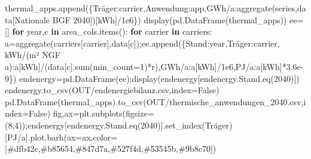 \documentclass[
  ngerman,
  a4paper,
  DIV=11]{scrreprt}
\newenvironment{Shaded}{\begin{snugshade}}{\end{snugshade}}
\newcommand{\BuiltInTok}[1]{\textcolor[rgb]{0.00,0.23,0.31}{#1}}
\newcommand{\ControlFlowTok}[1]{\textcolor[rgb]{0.00,0.23,0.31}{\textbf{#1}}}
\newcommand{\DecValTok}[1]{\textcolor[rgb]{0.68,0.00,0.00}{#1}}
\newcommand{\FloatTok}[1]{\textcolor[rgb]{0.68,0.00,0.00}{#1}}
\newcommand{\KeywordTok}[1]{\textcolor[rgb]{0.00,0.23,0.31}{\textbf{#1}}}
\newcommand{\NormalTok}[1]{\textcolor[rgb]{0.00,0.23,0.31}{#1}}
\newcommand{\OperatorTok}[1]{\textcolor[rgb]{0.37,0.37,0.37}{#1}}
\newcommand{\StringTok}[1]{\textcolor[rgb]{0.13,0.47,0.30}{#1}}
\newcommand{\VariableTok}[1]{\textcolor[rgb]{0.07,0.07,0.07}{#1}}
\begin{document}
\begin{Shaded}
\begin{Highlighting}[]
\NormalTok{        thermal\_apps.append(\{}\StringTok{\textquotesingle{}Träger\textquotesingle{}}\NormalTok{:carrier,}\StringTok{\textquotesingle{}Anwendung\textquotesingle{}}\NormalTok{:app,}\StringTok{\textquotesingle{}GWh/a\textquotesingle{}}\NormalTok{:aggregate(series,data[}\StringTok{\textquotesingle{}Nationale BGF 2040\textquotesingle{}}\NormalTok{])[}\StringTok{\textquotesingle{}kWh\textquotesingle{}}\NormalTok{]}\OperatorTok{/}\FloatTok{1e6}\NormalTok{\})}
\NormalTok{display(pd.DataFrame(thermal\_apps))}
\NormalTok{ee}\OperatorTok{=}\NormalTok{[]}
\ControlFlowTok{for}\NormalTok{ year,c }\KeywordTok{in}\NormalTok{ area\_cols.items():}
    \ControlFlowTok{for}\NormalTok{ carrier }\KeywordTok{in}\NormalTok{ carriers:}
\NormalTok{        a}\OperatorTok{=}\NormalTok{aggregate(carriers[carrier],data[c])}\OperatorTok{;}\NormalTok{ee.append(\{}\StringTok{\textquotesingle{}Stand\textquotesingle{}}\NormalTok{:year,}\StringTok{\textquotesingle{}Träger\textquotesingle{}}\NormalTok{:carrier,}
            \StringTok{\textquotesingle{}kWh/(m² NGF a)\textquotesingle{}}\NormalTok{:a[}\StringTok{\textquotesingle{}kWh\textquotesingle{}}\NormalTok{]}\OperatorTok{/}\NormalTok{(data[c].}\BuiltInTok{sum}\NormalTok{(min\_count}\OperatorTok{=}\DecValTok{1}\NormalTok{)}\OperatorTok{*}\NormalTok{r),}\StringTok{\textquotesingle{}GWh/a\textquotesingle{}}\NormalTok{:a[}\StringTok{\textquotesingle{}kWh\textquotesingle{}}\NormalTok{]}\OperatorTok{/}\FloatTok{1e6}\NormalTok{,}\StringTok{\textquotesingle{}PJ/a\textquotesingle{}}\NormalTok{:a[}\StringTok{\textquotesingle{}kWh\textquotesingle{}}\NormalTok{]}\OperatorTok{*}\FloatTok{3.6e{-}9}\NormalTok{\})}
\NormalTok{endenergy}\OperatorTok{=}\NormalTok{pd.DataFrame(ee)}\OperatorTok{;}\NormalTok{display(endenergy[endenergy.Stand.eq(}\StringTok{\textquotesingle{}2040\textquotesingle{}}\NormalTok{)])}
\NormalTok{endenergy.to\_csv(OUT}\OperatorTok{/}\StringTok{\textquotesingle{}endenergiebilanz.csv\textquotesingle{}}\NormalTok{,index}\OperatorTok{=}\VariableTok{False}\NormalTok{)}
\NormalTok{pd.DataFrame(thermal\_apps).to\_csv(OUT}\OperatorTok{/}\StringTok{\textquotesingle{}thermische\_anwendungen\_2040.csv\textquotesingle{}}\NormalTok{,index}\OperatorTok{=}\VariableTok{False}\NormalTok{)}
\NormalTok{fig,ax}\OperatorTok{=}\NormalTok{plt.subplots(figsize}\OperatorTok{=}\NormalTok{(}\DecValTok{8}\NormalTok{,}\DecValTok{4}\NormalTok{))}\OperatorTok{;}\NormalTok{endenergy[endenergy.Stand.eq(}\StringTok{\textquotesingle{}2040\textquotesingle{}}\NormalTok{)].set\_index(}\StringTok{\textquotesingle{}Träger\textquotesingle{}}\NormalTok{)[}\StringTok{\textquotesingle{}PJ/a\textquotesingle{}}\NormalTok{].plot.barh(ax}\OperatorTok{=}\NormalTok{ax,color}\OperatorTok{=}\NormalTok{[}\StringTok{\textquotesingle{}\#dfb42c\textquotesingle{}}\NormalTok{,}\StringTok{\textquotesingle{}\#b85654\textquotesingle{}}\NormalTok{,}\StringTok{\textquotesingle{}\#847d7a\textquotesingle{}}\NormalTok{,}\StringTok{\textquotesingle{}\#527f4d\textquotesingle{}}\NormalTok{,}\StringTok{\textquotesingle{}\#53545b\textquotesingle{}}\NormalTok{,}\StringTok{\textquotesingle{}\#9b8c70\textquotesingle{}}\NormalTok{])}

\end{Highlighting}
\end{Shaded}
\end{document}
